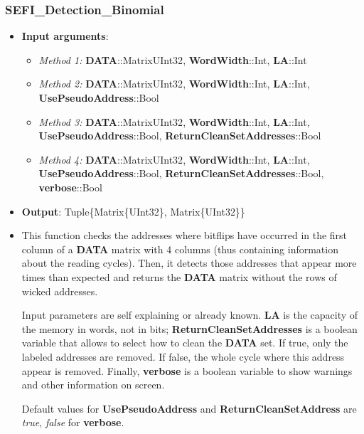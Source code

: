 	\subsubsection*{SEFI\_Detection\_Binomial}\label{Fun:SEFI_Detection_Binomial}
	\begin{itemize}
		\item \textbf{Input arguments}: 
		\begin{itemize}			\item \textit{Method 1:} \textbf{DATA}::Matrix{UInt32},
			\textbf{WordWidth}::Int,
			\textbf{LA}::Int
			
			\item \textit{Method 2:} \textbf{DATA}::Matrix{UInt32},
			\textbf{WordWidth}::Int,
			\textbf{LA}::Int,
			\textbf{UsePseudoAddress}::Bool
			
			\item \textit{Method 3:} \textbf{DATA}::Matrix{UInt32},
			\textbf{WordWidth}::Int,
			\textbf{LA}::Int,
			\textbf{UsePseudoAddress}::Bool,
			\textbf{ReturnCleanSetAddresses}::Bool
			
			
			\item \textit{Method 4:} \textbf{DATA}::Matrix{UInt32},
			\textbf{WordWidth}::Int,
			\textbf{LA}::Int,
			\textbf{UsePseudoAddress}::Bool,
			\textbf{ReturnCleanSetAddresses}::Bool,
			\textbf{verbose}::Bool
		
		\end{itemize}
		\item \textbf{Output}: Tuple\{Matrix\{UInt32\}, Matrix\{UInt32\}\}
		\item This function checks the addresses where bitflips have occurred in the first column of a \textbf{DATA} matrix with 4 columns (thus containing information about the reading cycles). Then, it detects those addresses that appear more times than expected and returns the \textbf{DATA} matrix without the rows of  wicked addresses. 
		
		Input parameters are self explaining or already known. \textbf{LA} is the capacity of the memory in words, not in bits; \textbf{ReturnCleanSetAddresses} is a boolean variable that allows to select how to clean the \textbf{DATA} set. If true, only the labeled addresses are removed. If false, the whole cycle where this address appear is removed. Finally, \textbf{verbose} is a boolean variable to show warnings and other information on screen.
		
		Default values for \textbf{UsePseudoAddress} and \textbf{ReturnCleanSetAddress} are \textit{true}, \textit{false} for \textbf{verbose}.
		

\end{itemize}
